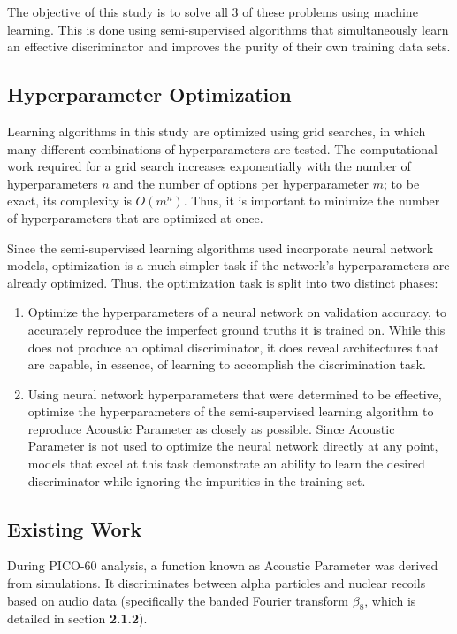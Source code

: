 \documentclass[10pt]{article}
\begin{document}
The objective of this study is to solve all 3 of these problems using machine learning. This is done using semi-supervised algorithms that simultaneously learn an effective discriminator and improves the purity of their own training data sets.

\subsection{Hyperparameter Optimization}

Learning algorithms in this study are optimized using grid searches, in which many different combinations of hyperparameters are tested. The computational work required for a grid search increases exponentially with the number of hyperparameters $n$ and the number of options per hyperparameter $m$; to be exact, its complexity is $O(m^{n})$. Thus, it is important to minimize the number of hyperparameters that are optimized at once.

Since the semi-supervised learning algorithms used incorporate  neural network models, optimization is a much simpler task if the network's hyperparameters are already optimized. Thus, the optimization task is split into two distinct phases:

\begin{enumerate}
    \item Optimize the hyperparameters of a neural network on validation accuracy, to accurately reproduce the imperfect ground truths it is trained on. While this does not produce an optimal discriminator, it does reveal architectures that are capable, in essence, of learning to accomplish the discrimination task.
    \item Using neural network hyperparameters that were determined to be effective, optimize the hyperparameters of the semi-supervised learning algorithm to reproduce Acoustic Parameter as closely as possible. Since Acoustic Parameter is not used to optimize the neural network directly at any point, models that excel at this task demonstrate an ability to learn the desired discriminator while ignoring the impurities in the training set.
\end{enumerate}

\subsection{Existing Work}

During PICO-60 analysis, a function known as Acoustic Parameter was derived from simulations. It discriminates between alpha particles and nuclear recoils based on audio data (specifically the banded Fourier transform $\beta_{8}$, which is detailed in section \textbf{2.1.2}).
\end{document}
